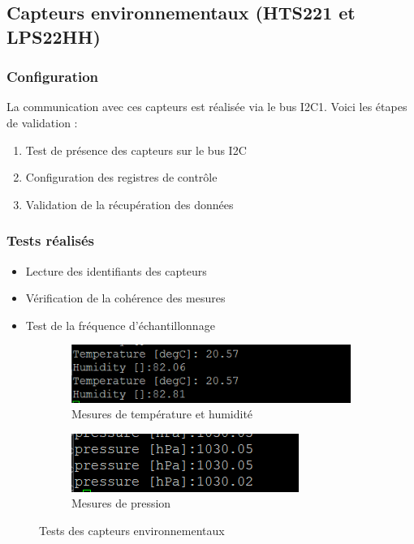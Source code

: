 \documentclass[12pt]{article}
\begin{document}
\subsection{Capteurs environnementaux (HTS221 et LPS22HH)}
\subsubsection{Configuration}
La communication avec ces capteurs est réalisée via le bus I2C1. Voici les étapes de validation :
\begin{enumerate}
    \item Test de présence des capteurs sur le bus I2C
    \item Configuration des registres de contrôle
    \item Validation de la récupération des données
\end{enumerate}

\subsubsection{Tests réalisés}
\begin{itemize}
    \item Lecture des identifiants des capteurs
    \item Vérification de la cohérence des mesures
    \item Test de la fréquence d'échantillonnage
\end{itemize}

\begin{figure}[H]
    \centering
    \begin{subfigure}[b]{0.45\textwidth}
        \centering
        \includegraphics[width=\textwidth]{./images/test_unit_temp_hum.png}
        \caption{Mesures de température et humidité}
        \label{fig:test_temp_hum}
    \end{subfigure}
    \hfill
    \begin{subfigure}[b]{0.45\textwidth}
        \centering
        \includegraphics[width=\textwidth]{./images/test_unit_press.png}
        \caption{Mesures de pression}
        \label{fig:test_press}
    \end{subfigure}
    \caption{Tests des capteurs environnementaux}
    \label{fig:test_enviro}
\end{figure}
\end{document}
